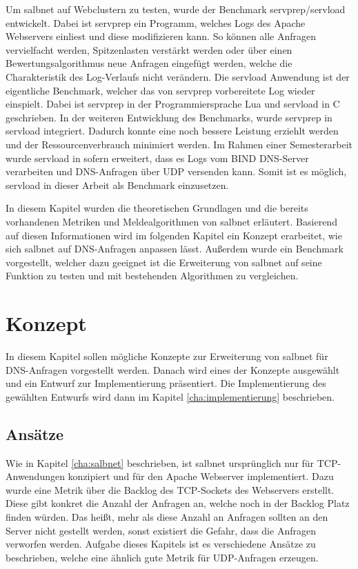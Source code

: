 \documentclass[a4paper, 12pt, BCOR10mm, DIV12, toc=bibliography, toc=listof, german]{scrbook}
\begin{document}
	Um salbnet auf Webclustern zu testen, wurde der Benchmark servprep/servload \cite{habenschuss2011}
	entwickelt. Dabei ist servprep ein Programm, welches Logs des Apache Webservers einliest und diese
	modifizieren kann. So können alle Anfragen vervielfacht werden, Spitzenlasten verstärkt werden
	oder über einen Bewertungsalgorithmus neue Anfragen eingefügt werden, welche die Charakteristik
	des Log-Verlaufs nicht verändern. Die servload Anwendung ist der eigentliche Benchmark, welcher
	das von servprep vorbereitete Log wieder einspielt. Dabei ist servprep in der Programmiersprache
	Lua und servload in C geschrieben. In der weiteren Entwicklung des Benchmarks, wurde servprep in
	servload integriert. Dadurch konnte eine noch bessere Leistung erziehlt werden und der
	Ressourcenverbrauch minimiert werden. Im Rahmen einer Semesterarbeit \cite{menski2012} wurde
	servload in sofern erweitert, dass es Logs vom BIND DNS-Server verarbeiten und DNS-Anfragen über
	UDP versenden kann. Somit ist es möglich, servload in dieser Arbeit als Benchmark einzusetzen.

	In diesem Kapitel wurden die theoretischen Grundlagen und die bereits vorhandenen Metriken und
	Meldealgorithmen von salbnet erläutert. Basierend auf diesen Informationen wird im folgenden
	Kapitel ein Konzept erarbeitet, wie sich salbnet auf DNS-Anfragen anpassen lässt. Außerdem wurde
	ein Benchmark vorgestellt, welcher dazu geeignet ist die Erweiterung von salbnet auf seine
	Funktion zu testen und mit bestehenden Algorithmen zu vergleichen. 


	\chapter{Konzept} %
	\label{cha:konzept}

	In diesem Kapitel sollen mögliche Konzepte zur Erweiterung von salbnet für DNS-Anfragen
	vorgestellt werden. Danach wird eines der Konzepte ausgewählt und ein Entwurf zur Implementierung
	präsentiert. Die Implementierung des gewählten Entwurfs wird dann im Kapitel
	\ref{cha:implementierung} beschrieben.


		\section{Ansätze} %
		\label{sec:ansaetze}

		Wie in Kapitel \ref{cha:salbnet} beschrieben, ist salbnet ursprünglich nur für TCP-Anwendungen
		konzipiert und für den Apache Webserver implementiert. Dazu wurde eine Metrik über die Backlog
		des TCP-Sockets des Webservers erstellt. Diese gibt konkret die Anzahl der Anfragen an, welche
		noch in der Backlog Platz finden würden. Das heißt, mehr als diese Anzahl an Anfragen sollten an
		den Server nicht gestellt werden, sonst existiert die Gefahr, dass die Anfragen verworfen
		werden. Aufgabe dieses Kapitels ist es verschiedene Ansätze zu beschrieben, welche eine ähnlich
		gute Metrik für UDP-Anfragen erzeugen. 
\end{document}
